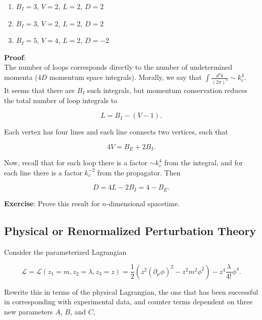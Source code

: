 \begin{enumerate}
\item $B_I = 3$, $V=2$, $L=2$, $D=2$
\item $B_I = 3$, $V=2$, $L=2$, $D=2$
\item $B_I = 5$, $V=4$, $L=2$, $D=-2$
\end{enumerate}

\noindent \textbf{Proof}: \\

\noindent The number of loops corresponds directly to the number of undetermined momenta ($4D$ momentum space integrals). Morally, we say that $\int \frac{d^4 k}{(2 \pi)^4} \sim k_c^4$. \\
 
 \noindent It seems that there are $B_I$ such integrals, but momentum conservation reduces the total number of loop integrals to 
 
\begin{equation}
L = B_I - (V - 1).
\end{equation}

\noindent Each vertex has four lines and each line connects two vertices, such that 

\begin{equation}
4V = B_E + 2 B_I.
\end{equation}

\noindent Now, recall that for each loop there is a factor $\sim k_c^4$ from the integral, and for each line there is a factor $k_c^{-2}$ from the propagator. Then

\begin{equation}
D = 4 L - 2 B_I = 4 - B_E .
\end{equation}

\noindent \textbf{Exercise}: Prove this result for $n$-dimensional spacetime.

\subsection*{Physical or Renormalized Perturbation Theory}

\noindent Consider the parameterized Lagrangian

\begin{equation}
\mathcal{L} = \mathcal{L} (z_1 = m, z_2 = \lambda, z_3 = z) = \frac{1}{2} (z^2 (\partial_\mu \phi)^2 - z^2 m^2 \phi^2 ) - z^4 \frac{\lambda}{4!} \phi^4.
\end{equation}

\noindent Rewrite this in terms of the physical Lagrangian, the one that has been successful in corresponding with experimental data, and counter terms dependent on three new parameters $A$, $B$, and $C$,

